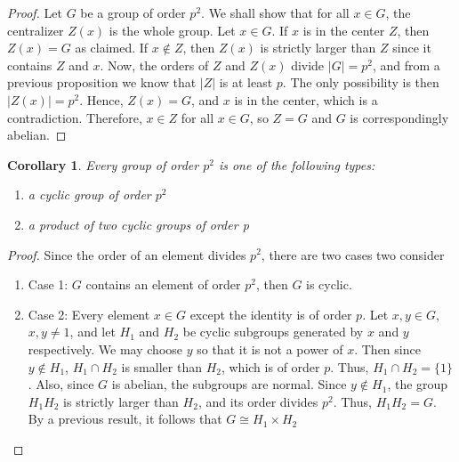 \documentclass[12pt]{article}
\newtheorem{cor}[thm]{Corollary}
\theoremstyle{definition}
\theoremstyle{remark}
\numberwithin{equation}{section}
\begin{document}
\begin{proof}
        Let $G$ be a group of order $p^2$. We shall show that for all $x \in G$, the centralizer $Z(x)$ is the whole group. Let $x \in G$. If $x$ is in the center $Z$, then $Z(x) = G$ as claimed. If $x \notin Z$, then $Z(x)$ is strictly larger than $Z$ since it contains $Z$ and $x$. Now, the orders of $Z$ and $Z(x)$ divide $|G|=p^2$, and from a previous proposition we know that $|Z|$ is at least $p$. The only possibility is then $|Z(x)| = p^2$. Hence, $Z(x) = G$, and $x$ is in the center, which is a contradiction. Therefore, $x \in Z$ for all $x \in G$, so $Z = G$ and $G$ is correspondingly abelian.
\end{proof}


\vspace{15pt}


\begin{cor}
        Every group of order $p^2$ is one of the following types: \begin{enumerate}
                \item a cyclic group of order $p^2$
                \item a product of two cyclic groups of order p
        \end{enumerate}
\end{cor}
\begin{proof}
        Since the order of an element divides $p^2$, there are two cases two consider \begin{enumerate}
                \item[] Case 1: $G$ contains an element of order $p^2$, then $G$ is cyclic.
                \item[] Case 2: Every element $x \in G$ except the identity is of order $p$. Let $x,y \in G$, $x,y \neq 1$, and let $H_1$ and $H_2$ be cyclic subgroups generated by $x$ and $y$ respectively. We may choose $y$ so that it is not a power of $x$. Then since $y \notin H_1$, $H_1 \cap H_2$ is smaller than $H_2$, which is of order $p$. Thus, $H_1 \cap H_2 = \{1\}$. Also, since $G$ is abelian, the subgroups are normal. Since $y \notin H_1$, the group $H_1H_2$ is strictly larger than $H_2$, and its order divides $p^2$. Thus, $H_1H_2 = G$. By a previous result, it follows that $G \cong H_1 \times H_2$
        \end{enumerate}
\end{proof}


\vspace{15pt}
\end{document}
